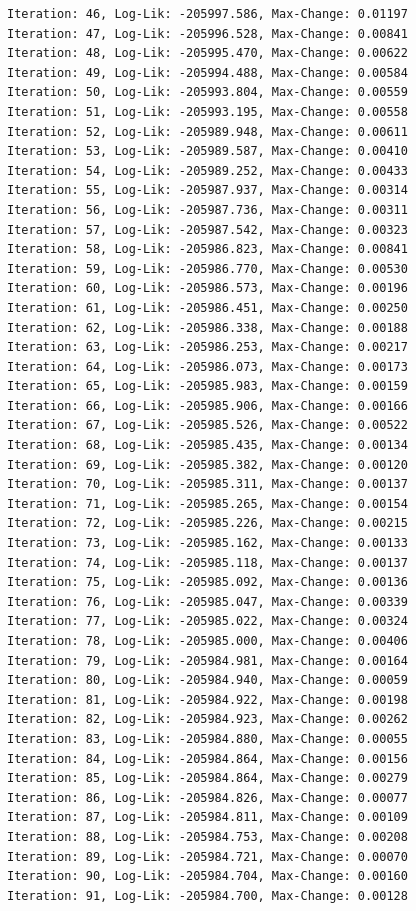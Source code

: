 \documentclass[
  letterpaper,
  DIV=11,
  numbers=noendperiod]{scrreport}
\begin{document}
\begin{verbatim}
Iteration: 46, Log-Lik: -205997.586, Max-Change: 0.01197
Iteration: 47, Log-Lik: -205996.528, Max-Change: 0.00841
Iteration: 48, Log-Lik: -205995.470, Max-Change: 0.00622
Iteration: 49, Log-Lik: -205994.488, Max-Change: 0.00584
Iteration: 50, Log-Lik: -205993.804, Max-Change: 0.00559
Iteration: 51, Log-Lik: -205993.195, Max-Change: 0.00558
Iteration: 52, Log-Lik: -205989.948, Max-Change: 0.00611
Iteration: 53, Log-Lik: -205989.587, Max-Change: 0.00410
Iteration: 54, Log-Lik: -205989.252, Max-Change: 0.00433
Iteration: 55, Log-Lik: -205987.937, Max-Change: 0.00314
Iteration: 56, Log-Lik: -205987.736, Max-Change: 0.00311
Iteration: 57, Log-Lik: -205987.542, Max-Change: 0.00323
Iteration: 58, Log-Lik: -205986.823, Max-Change: 0.00841
Iteration: 59, Log-Lik: -205986.770, Max-Change: 0.00530
Iteration: 60, Log-Lik: -205986.573, Max-Change: 0.00196
Iteration: 61, Log-Lik: -205986.451, Max-Change: 0.00250
Iteration: 62, Log-Lik: -205986.338, Max-Change: 0.00188
Iteration: 63, Log-Lik: -205986.253, Max-Change: 0.00217
Iteration: 64, Log-Lik: -205986.073, Max-Change: 0.00173
Iteration: 65, Log-Lik: -205985.983, Max-Change: 0.00159
Iteration: 66, Log-Lik: -205985.906, Max-Change: 0.00166
Iteration: 67, Log-Lik: -205985.526, Max-Change: 0.00522
Iteration: 68, Log-Lik: -205985.435, Max-Change: 0.00134
Iteration: 69, Log-Lik: -205985.382, Max-Change: 0.00120
Iteration: 70, Log-Lik: -205985.311, Max-Change: 0.00137
Iteration: 71, Log-Lik: -205985.265, Max-Change: 0.00154
Iteration: 72, Log-Lik: -205985.226, Max-Change: 0.00215
Iteration: 73, Log-Lik: -205985.162, Max-Change: 0.00133
Iteration: 74, Log-Lik: -205985.118, Max-Change: 0.00137
Iteration: 75, Log-Lik: -205985.092, Max-Change: 0.00136
Iteration: 76, Log-Lik: -205985.047, Max-Change: 0.00339
Iteration: 77, Log-Lik: -205985.022, Max-Change: 0.00324
Iteration: 78, Log-Lik: -205985.000, Max-Change: 0.00406
Iteration: 79, Log-Lik: -205984.981, Max-Change: 0.00164
Iteration: 80, Log-Lik: -205984.940, Max-Change: 0.00059
Iteration: 81, Log-Lik: -205984.922, Max-Change: 0.00198
Iteration: 82, Log-Lik: -205984.923, Max-Change: 0.00262
Iteration: 83, Log-Lik: -205984.880, Max-Change: 0.00055
Iteration: 84, Log-Lik: -205984.864, Max-Change: 0.00156
Iteration: 85, Log-Lik: -205984.864, Max-Change: 0.00279
Iteration: 86, Log-Lik: -205984.826, Max-Change: 0.00077
Iteration: 87, Log-Lik: -205984.811, Max-Change: 0.00109
Iteration: 88, Log-Lik: -205984.753, Max-Change: 0.00208
Iteration: 89, Log-Lik: -205984.721, Max-Change: 0.00070
Iteration: 90, Log-Lik: -205984.704, Max-Change: 0.00160
Iteration: 91, Log-Lik: -205984.700, Max-Change: 0.00128

\end{verbatim}
\end{document}
